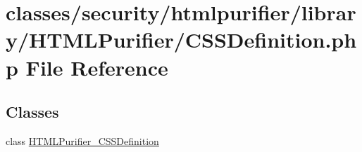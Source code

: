 \hypertarget{CSSDefinition_8php}{\section{classes/security/htmlpurifier/library/\+H\+T\+M\+L\+Purifier/\+C\+S\+S\+Definition.php File Reference}
\label{CSSDefinition_8php}
}
\subsection*{Classes}
\begin{DoxyCompactItemize}
\item 
class \hyperlink{classHTMLPurifier__CSSDefinition}{H\+T\+M\+L\+Purifier\+\_\+\+C\+S\+S\+Definition}
\end{DoxyCompactItemize}
